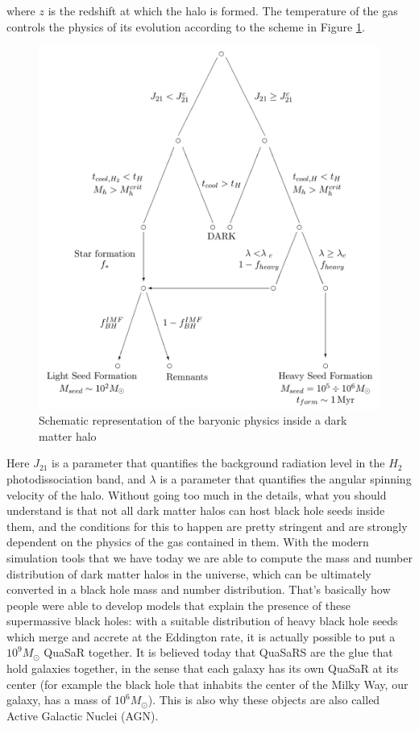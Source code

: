 \documentclass[11pt, a4paper,oneside,openright]{book}
\numberwithin{equation}{section}
\begin{document}
where $z$ is the redshift at which the halo is formed. The temperature of the gas controls the physics of its evolution according to the scheme in Figure \ref{barscheme}. 
\begin{figure}
\begin{center}
\includegraphics[scale=0.5]{Draw/seeding_scheme.pdf}
\end{center}
\caption{Schematic representation of the baryonic physics inside a dark matter halo}
\label{barscheme}
\end{figure}
Here $J_{21}$ is a parameter that quantifies the background radiation level in the $H_2$ photodissociation band, and $\lambda$ is a parameter that quantifies the angular spinning velocity of the halo. Without going too much in the details, what you should understand is that not all dark matter halos can host black hole seeds inside them, and the conditions for this to happen are pretty stringent and are strongly dependent on the physics of the gas contained in them. With the modern simulation tools that we have today we are able to compute the mass and number distribution of dark matter halos in the universe, which can be ultimately converted in a black hole mass and number distribution. That's basically how people were able to develop models that explain the presence of these supermassive black holes: with a suitable distribution of heavy black hole seeds which merge and accrete at the Eddington rate, it is actually possible to put a $10^9 M_\odot$ QuaSaR together. It is believed today that QuaSaRS are the glue that hold galaxies together, in the sense that each galaxy has its own QuaSaR at its center (for example the black hole that inhabits the center of the Milky Way, our galaxy, has a mass of $10^6 M_\odot$). This is also why these objects are also called Active Galactic Nuclei (AGN).   
\end{document}
